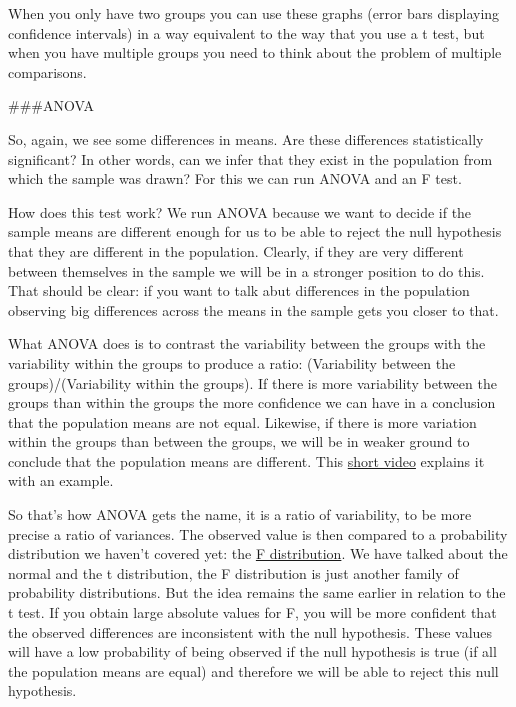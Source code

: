\documentclass[]{book}
\theoremstyle{definition}
\theoremstyle{definition}
\theoremstyle{definition}
\theoremstyle{remark}
\begin{document}
When you only have two groups you can use these graphs (error bars
displaying confidence intervals) in a way equivalent to the way that you
use a t test, but when you have multiple groups you need to think about
the problem of multiple comparisons.

\#\#\#ANOVA

So, again, we see some differences in means. Are these differences
statistically significant? In other words, can we infer that they exist
in the population from which the sample was drawn? For this we can run
ANOVA and an F test.

How does this test work? We run ANOVA because we want to decide if the
sample means are different enough for us to be able to reject the null
hypothesis that they are different in the population. Clearly, if they
are very different between themselves in the sample we will be in a
stronger position to do this. That should be clear: if you want to talk
abut differences in the population observing big differences across the
means in the sample gets you closer to that.

What ANOVA does is to contrast the variability between the groups with
the variability within the groups to produce a ratio: (Variability
between the groups)/(Variability within the groups). If there is more
variability between the groups than within the groups the more
confidence we can have in a conclusion that the population means are not
equal. Likewise, if there is more variation within the groups than
between the groups, we will be in weaker ground to conclude that the
population means are different. This
\href{https://www.youtube.com/watch?v=ITf4vHhyGpc}{short video} explains
it with an example.

So that's how ANOVA gets the name, it is a ratio of variability, to be
more precise a ratio of variances. The observed value is then compared
to a probability distribution we haven't covered yet: the
\href{http://en.wikipedia.org/wiki/F-distribution}{F distribution}. We
have talked about the normal and the t distribution, the F distribution
is just another family of probability distributions. But the idea
remains the same earlier in relation to the t test. If you obtain large
absolute values for F, you will be more confident that the observed
differences are inconsistent with the null hypothesis. These values will
have a low probability of being observed if the null hypothesis is true
(if all the population means are equal) and therefore we will be able to
reject this null hypothesis.
\end{document}
